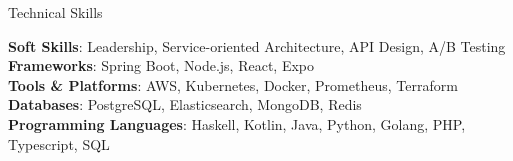 \documentclass[
	10pt, %
]{resume} %
\begin{document}

\begin{rSection}{Technical Skills}

    \textbf{Soft Skills}: Leadership, Service-oriented Architecture, API Design, A/B Testing \\
    \textbf{Frameworks}: Spring Boot, Node.js, React, Expo \\
    \textbf{Tools \& Platforms}: AWS, Kubernetes, Docker, Prometheus, Terraform \\
    \textbf{Databases}: PostgreSQL, Elasticsearch, MongoDB, Redis \\
    \textbf{Programming Languages}: Haskell, Kotlin, Java, Python, Golang, PHP, Typescript, SQL \\

\end{rSection}






\end{document}
